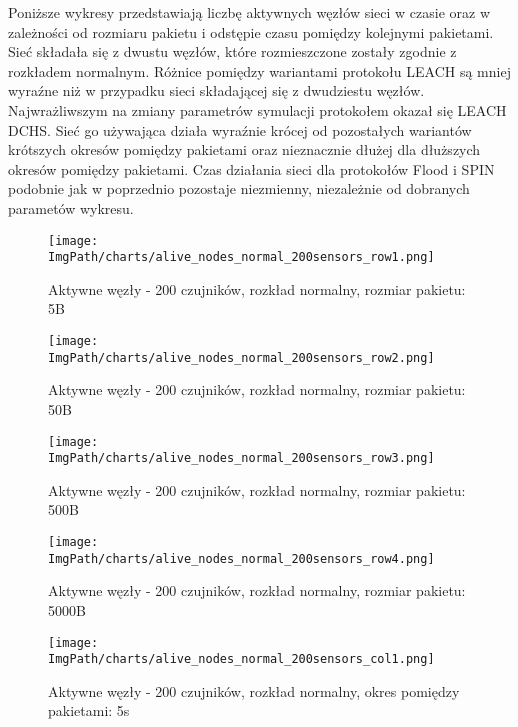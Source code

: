 Poniższe wykresy przedstawiają liczbę aktywnych węzłów sieci w czasie oraz w zależności od rozmiaru pakietu i odstępie czasu pomiędzy kolejnymi pakietami. Sieć składała się z dwustu węzłów, które rozmieszczone zostały zgodnie z rozkładem normalnym. Różnice pomiędzy wariantami protokołu LEACH są mniej wyraźne niż w przypadku sieci składającej się z dwudziestu węzłów. Najwrażliwszym na zmiany parametrów symulacji protokołem okazał się LEACH DCHS. Sieć go używająca działa wyraźnie krócej od pozostałych wariantów krótszych okresów pomiędzy pakietami oraz nieznacznie dłużej dla dłuższych okresów pomiędzy pakietami. Czas działania sieci dla protokołów Flood i SPIN podobnie jak w poprzednio pozostaje niezmienny, niezależnie od dobranych parametów wykresu.

\begin{figure}[!htbp]
	\begin{center}
		\texttt{[image: \\ImgPath/charts/alive\_nodes\_normal\_200sensors\_row1.png]}
	\end{center}
	\caption{Aktywne węzły - 200 czujników, rozkład normalny, rozmiar pakietu: 5B}
\end{figure}

\begin{figure}[!htbp]
	\begin{center}
		\texttt{[image: \\ImgPath/charts/alive\_nodes\_normal\_200sensors\_row2.png]}
	\end{center}
	\caption{Aktywne węzły - 200 czujników, rozkład normalny, rozmiar pakietu: 50B}
\end{figure}

\begin{figure}[!htbp]
	\begin{center}
		\texttt{[image: \\ImgPath/charts/alive\_nodes\_normal\_200sensors\_row3.png]}
	\end{center}
	\caption{Aktywne węzły - 200 czujników, rozkład normalny, rozmiar pakietu: 500B}
\end{figure}

\begin{figure}[!htbp]
	\begin{center}
		\texttt{[image: \\ImgPath/charts/alive\_nodes\_normal\_200sensors\_row4.png]}
	\end{center}
	\caption{Aktywne węzły - 200 czujników, rozkład normalny, rozmiar pakietu: 5000B}
\end{figure}

\begin{figure}[!htbp]
	\begin{center}
		\texttt{[image: \\ImgPath/charts/alive\_nodes\_normal\_200sensors\_col1.png]}
	\end{center}
	\caption{Aktywne węzły - 200 czujników, rozkład normalny, okres pomiędzy pakietami: 5s}
\end{figure}

